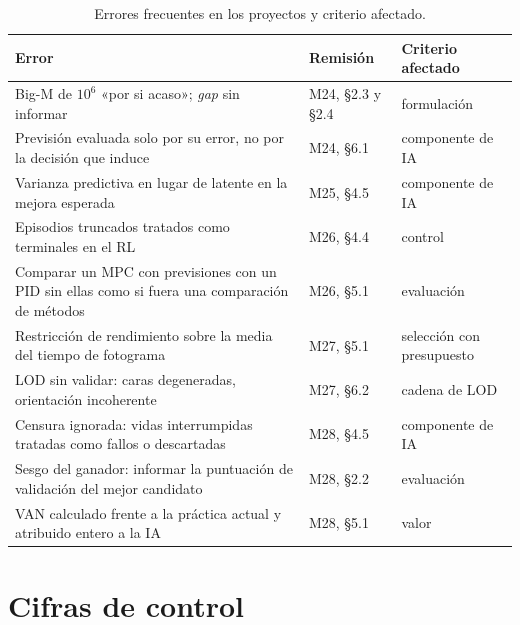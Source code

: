 \begin{table}[H]
\centering\small
\caption{Errores frecuentes en los proyectos y criterio afectado.}\label{tab:errores-proyecto}
\begin{tabularx}{\textwidth}{@{}>{\raggedright\arraybackslash}X>{\raggedright\arraybackslash}p{3.8cm}>{\raggedright\arraybackslash}p{3.0cm}@{}}
\toprule
Error & Remisión & Criterio afectado \\
\midrule
Big-M de $10^{6}$ «por si acaso»; \emph{gap} sin informar & M24, §2.3 y §2.4 & formulación \\
Previsión evaluada solo por su error, no por la decisión que induce & M24, §6.1 & componente de IA \\
Varianza predictiva en lugar de latente en la mejora esperada & M25, §4.5 & componente de IA \\
Episodios truncados tratados como terminales en el RL & M26, §4.4 & control \\
Comparar un MPC con previsiones con un PID sin ellas como si fuera una comparación de métodos & M26, §5.1 & evaluación \\
Restricción de rendimiento sobre la media del tiempo de fotograma & M27, §5.1 & selección con presupuesto \\
LOD sin validar: caras degeneradas, orientación incoherente & M27, §6.2 & cadena de LOD \\
Censura ignorada: vidas interrumpidas tratadas como fallos o descartadas & M28, §4.5 & componente de IA \\
Sesgo del ganador: informar la puntuación de validación del mejor candidato & M28, §2.2 & evaluación \\
VAN calculado frente a la práctica actual y atribuido entero a la IA & M28, §5.1 & valor \\
\bottomrule
\end{tabularx}
\end{table}

\section{Cifras de control}

